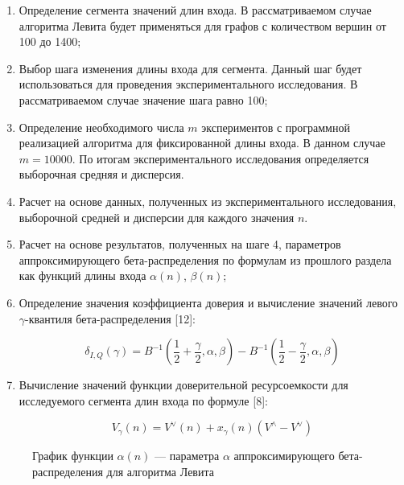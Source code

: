 \begin{enumerate}
\item Определение сегмента значений длин входа. В рассматриваемом случае алгоритма Левита будет применяться для графов с количеством вершин от 100 до 1400;

\item Выбор шага изменения длины входа для сегмента. Данный
шаг будет использоваться для проведения экспериментального исследования. В рассматриваемом случае значение шага равно 100;

\item Определение необходимого числа $m$ экспериментов с программной
реализацией алгоритма для фиксированной длины входа. В данном случае $m = 10000$. По итогам экспериментального исследования определяется выборочная средняя и дисперсия. 

\item Расчет на основе данных, полученных из экспериментального исследования, выборочной средней и дисперсии для каждого значения $n$.

\item Расчет на основе результатов, полученных на шаге 4, параметров
аппроксимирующего бета-распределения по формулам из прошлого раздела как
функций длины входа $\alpha(n)$, $\beta(n)$;

\item Определение значения коэффициента доверия и вычисление значений левого $\gamma$-квантиля бета-распределения [12]:

$$\delta_{I, Q}(\gamma) = B^{-1}(\frac{1}{2} + \frac{\gamma}{2}, \alpha, \beta) - B^{-1}(\frac{1}{2} - \frac{\gamma}{2}, \alpha, \beta)$$

\item Вычисление значений функции доверительной ресурсоемкости для исследуемого сегмента длин входа по формуле [8]:

$$V_{\gamma}(n) = V^{\vee}(n) + x_{\gamma}(n)(V^{\wedge} - V^{\vee})$$

\end{enumerate}


\begin{figure}[h!]
\caption{График функции $\alpha(n)$ — параметра $\alpha$ аппроксимирующего бета-распределения для алгоритма Левита}
\label{ris:image1}
\end{figure}

